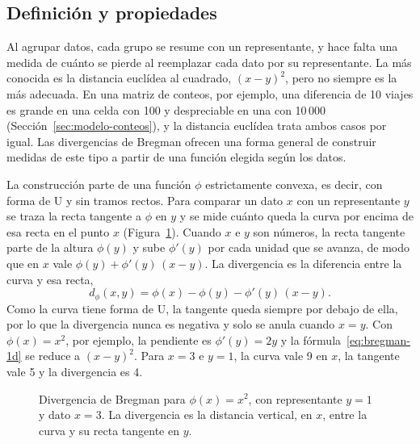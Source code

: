 \subsection{Definición y propiedades}

Al agrupar datos, cada grupo se resume con un representante, y hace falta una
medida de cuánto se pierde al reemplazar cada dato por su representante. La más
conocida es la distancia euclídea al cuadrado, $(x - y)^2$, pero no siempre es la
más adecuada. En una matriz de conteos, por ejemplo, una diferencia de 10 viajes
es grande en una celda con 100 y despreciable en una con 10\,000
(Sección~\ref{sec:modelo-conteos}), y la distancia euclídea trata ambos casos por
igual. Las divergencias de Bregman ofrecen una forma general de construir medidas
de este tipo a partir de una función elegida según los datos.

La construcción parte de una función $\phi$ estrictamente convexa, es decir, con
forma de U y sin tramos rectos. Para comparar un dato $x$ con un representante
$y$ se traza la recta tangente a $\phi$ en $y$ y se mide cuánto queda la curva
por encima de esa recta en el punto $x$ (Figura~\ref{fig:bregman}). Cuando $x$ e
$y$ son números, la recta tangente parte de la altura $\phi(y)$ y sube
$\phi'(y)$ por cada unidad que se avanza, de modo que en $x$ vale
$\phi(y) + \phi'(y)\,(x - y)$. La divergencia es la diferencia entre la curva y
esa recta,
\begin{equation}\label{eq:bregman-1d}
  d_\phi(x, y) = \phi(x) - \phi(y) - \phi'(y)\,(x - y).
\end{equation}
Como la curva tiene forma de U, la tangente queda siempre por debajo de ella, por
lo que la divergencia nunca es negativa y solo se anula cuando $x = y$. Con
$\phi(x) = x^2$, por ejemplo, la pendiente es $\phi'(y) = 2y$ y la
fórmula~\eqref{eq:bregman-1d} se reduce a $(x - y)^2$. Para $x = 3$ e $y = 1$, la
curva vale 9 en $x$, la tangente vale 5 y la divergencia es 4.

\begin{figure}[ht]
  \centering
  \caption{Divergencia de Bregman para $\phi(x) = x^2$, con representante
  $y = 1$ y dato $x = 3$. La divergencia es la distancia vertical, en $x$, entre
  la curva y su recta tangente en $y$.}
  \label{fig:bregman}
\end{figure}

